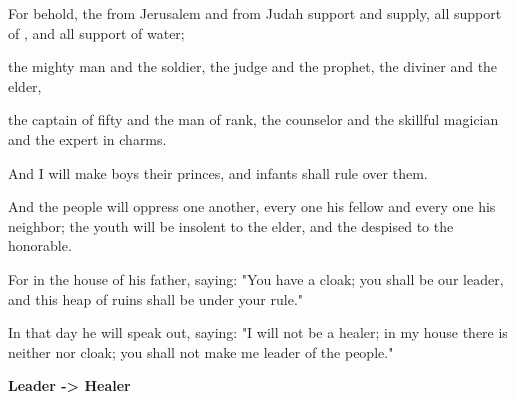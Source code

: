\documentclass[11pt]{article}
\begin{document}
\begin{biblicaloutline}[Isaiah 3:1-7]


\begin{versesection}{2em}
 For behold, the 
\poetryline {} from Jerusalem and from Judah
support and supply,
\poetryline all support of ,
\poetryline and all support of water;

 the mighty man and the soldier,
\poetryline the judge and the prophet,
\poetryline the diviner and the elder,

 the captain of fifty
\poetryline and the man of rank,
the counselor and the skillful magician
\poetryline and the expert in charms.
\end{versesection}


\begin{versesection}{2em}
 And I will make boys their princes,
\poetryline and infants shall rule over them.

 And the people will oppress one another,
\poetryline every one his fellow
\poetryline and every one his neighbor;
the youth will be insolent to the elder,
\poetryline and the despised to the honorable.
\end{versesection}


\begin{versesection}{2em}
 For 
\poetryline in the house of his father, saying:
"You have a cloak;
\poetryline you shall be our leader,
\poetryline and this heap of ruins
\poetryline shall be under your rule."

 In that day he will speak out, saying:
\poetryline "I will not be a healer;
in my house there is neither  nor cloak;
\poetryline you shall not make me
\poetryline leader of the people."
\end{versesection}

\end{biblicaloutline}

\vspace{3em}
{\large\bfseries Leader -> Healer}
\vspace{1em}
\end{document}
